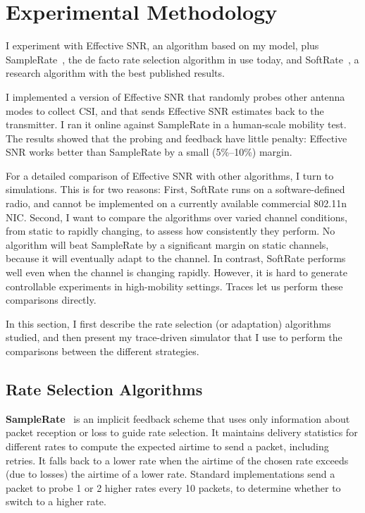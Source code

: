 \section{Experimental Methodology}
I experiment with Effective SNR, an algorithm based on my model, plus SampleRate~\cite{Bicket_SampleRate}, the de facto rate selection algorithm in use today, and SoftRate~\cite{Vutukuru_SoftRate}, a research algorithm with the best published results.

I implemented a version of Effective SNR that randomly probes other antenna modes to collect CSI, and that sends Effective SNR estimates back to the transmitter. I ran it online against SampleRate in a human-scale mobility test. The results showed that the probing and feedback have little penalty: Effective SNR works better than SampleRate by a small (5\%--10\%) margin.

For a detailed comparison of Effective SNR with other algorithms, I turn to simulations. This is for two reasons: First, SoftRate runs on a software-defined radio, and cannot be implemented on a currently available commercial 802.11n NIC. Second, I want to compare the algorithms over varied channel conditions, from static to rapidly changing, to assess how consistently they perform. 
No algorithm will beat SampleRate by a significant margin on static channels, because it will eventually adapt to the channel. In contrast, SoftRate performs well even when the channel is changing rapidly. However, it is hard to generate controllable experiments in high-mobility settings. Traces let us perform these comparisons directly.

In this section, I first describe the rate selection (or adaptation) algorithms studied, and then present my trace-driven simulator that I use to perform the comparisons between the different strategies.

\subsection{Rate Selection Algorithms}
\textbf{SampleRate}~\cite{Bicket_SampleRate} is an implicit feedback scheme that uses only information about packet reception or loss to guide rate selection.
It maintains delivery statistics for different rates to compute the expected airtime to send a packet, including retries.
It falls back to a lower rate when the airtime of the chosen rate exceeds (due to losses) the airtime of a lower rate.
Standard implementations send a packet to probe 1 or 2 higher rates every 10 packets, to determine whether to switch to a higher rate.

